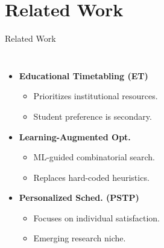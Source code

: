 
\section{Related Work}

\begin{frame}{Related Work}
    \begin{columns}[T]
        
            \begin{itemize}
                \item \textbf{Educational Timetabling (ET)}
                    \begin{itemize}
                        \item Prioritizes institutional resources.
                        \item Student preference is secondary.
                    \end{itemize}
                
                \item \textbf{Learning-Augmented Opt.}
                    \begin{itemize}
                        \item ML-guided combinatorial search.
                        \item Replaces hard-coded heuristics.
                    \end{itemize}
                
                \item \textbf{Personalized Sched. (PSTP)}
                    \begin{itemize}
                        \item Focuses on individual satisfaction.
                        \item Emerging research niche.
                    \end{itemize}
            \end{itemize}

\end{columns}
\end{frame}
